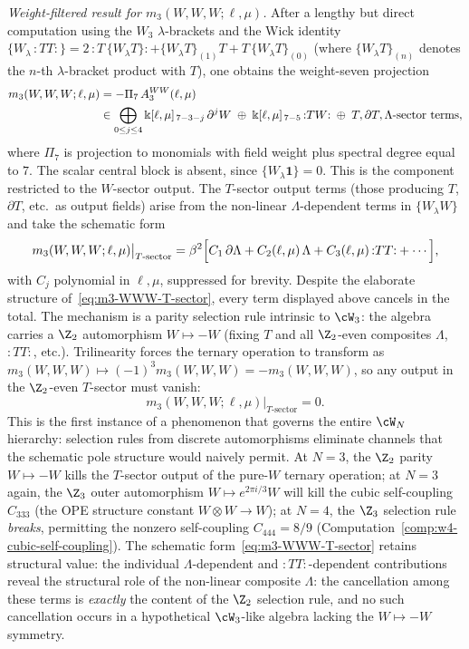\smallskip
\emph{Weight-filtered result for $m_3(W,W,W;\ell,\mu)$.}
After a lengthy but direct computation using the $W_3$ $\lambda$-brackets
and the Wick identity
$\{W_\lambda\, {:}TT{:}\}
 = 2\,{:}T\,\{W_\lambda T\}{:}
 + \{W_\lambda T\}_{(1)} T
 + T\,\{W_\lambda T\}_{(0)}$
(where $\{W_\lambda T\}_{(n)}$ denotes the $n$-th $\lambda$-bracket
product with $T$), one obtains the weight-seven projection
\begin{align}
\label{eq:m3-WWW}
m_3(W,W,W;\ell,\mu)
&= -\Pi_{7}\,A_3^{WW}(\ell,\mu) \notag\\
&\in
\bigoplus_{0\leq j\leq4}
\Bbbk[\ell,\mu]_{\,7-3-j}\,\partial^{j}W
\;\oplus\;
\Bbbk[\ell,\mu]_{\,7-5}\,{:}TW{:}
\;\oplus\;
\textup{\(T,\partial T,\Lambda\)-sector terms},
\end{align}
where \(\Pi_{7}\) is projection to monomials with
field weight plus spectral degree equal to \(7\).
The scalar central block is absent, since
\(\{W_{\lambda}\mathbf 1\}=0\).
This is the component restricted to the \(W\)-sector output.
The $T$-sector output terms (those producing $T$, $\partial T$, etc.\
as output fields) arise from the non-linear $\Lambda$-dependent
terms in $\{W_\lambda W\}$ and take the schematic form
\begin{equation}
\label{eq:m3-WWW-T-sector}
m_3(W,W,W;\ell,\mu)\big|_{T\text{-sector}}
= \beta^2\Bigl[
 C_1\,\partial\Lambda
 + C_2(\ell,\mu)\,\Lambda
 + C_3(\ell,\mu)\,{:}TT{:}
 + \cdots
 \Bigr],
\end{equation}
with $C_j$ polynomial in $\ell, \mu$, suppressed for brevity.
Despite the elaborate structure of~\eqref{eq:m3-WWW-T-sector},
every term displayed above cancels in the total.
The mechanism is a parity selection rule intrinsic to $\cW_3$:
the algebra carries a $\Z_2$ automorphism $W \mapsto -W$
(fixing $T$ and all $\Z_2$-even composites $\Lambda$, ${:}TT{:}$,
etc.). Trilinearity forces the ternary operation to transform as
$m_3(W,W,W) \mapsto (-1)^3 m_3(W,W,W) = -m_3(W,W,W)$,
so any output in the $\Z_2$-even $T$-sector must vanish:
\begin{equation}
\label{eq:m3-WWW-T-vanishing}
m_3(W,W,W;\ell,\mu)\big|_{T\text{-sector}} = 0.
\end{equation}
This is the first instance of a phenomenon that governs the
entire $\cW_N$ hierarchy: selection rules from discrete
automorphisms eliminate channels that the schematic pole
structure would naively permit. At $N = 3$, the $\Z_2$ parity
$W \mapsto -W$ kills the $T$-sector output of the pure-$W$
ternary operation; at $N = 3$ again, the $\Z_3$ outer automorphism
$W \mapsto e^{2\pi i/3}W$ will kill the cubic self-coupling
$C_{333}$ (the OPE structure constant $W \otimes W \to W$);
at $N = 4$, the $\Z_3$ selection rule \emph{breaks}, permitting
the nonzero self-coupling $C_{444} = 8/9$
(Computation~\ref{comp:w4-cubic-self-coupling}).
The schematic form~\eqref{eq:m3-WWW-T-sector} retains structural value:
the individual $\Lambda$-dependent and
${:}TT{:}$-dependent contributions reveal the structural role
of the non-linear composite $\Lambda$: the cancellation among
these terms is \emph{exactly} the content of the $\Z_2$
selection rule, and no such cancellation occurs in a
hypothetical $\cW_3$-like algebra lacking the $W \mapsto -W$
symmetry.

